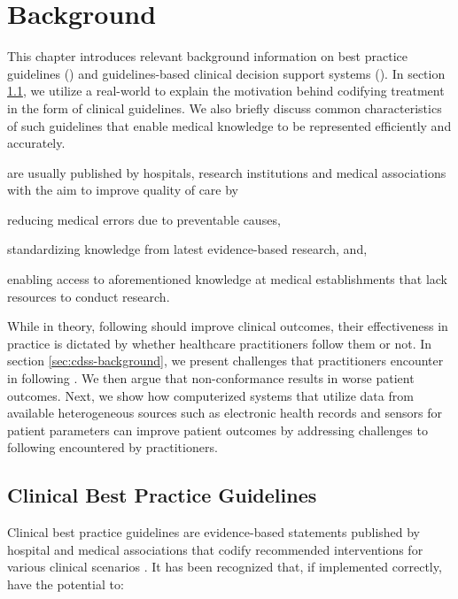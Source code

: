 \chapter{Background}

This chapter introduces relevant background information on
best practice guidelines (\BPG{}) and guidelines-based clinical decision support
systems (\CDSS{}).
In section \ref{sec:bpg-background}, we utilize a real-world \BPG{}
to explain the motivation behind codifying treatment
in the form of clinical guidelines. We also briefly discuss
common characteristics of such guidelines that enable medical knowledge
to be represented efficiently and accurately.

\BPGs{} are usually published by hospitals,
research institutions and medical associations with the aim to improve quality of care by
\begin{enumerate*}[label=(\alph*)]
  \item reducing medical errors due to preventable causes,
  \item standardizing knowledge from latest evidence-based research, and,
  \item enabling access to aforementioned knowledge at medical establishments
  that lack resources to conduct research.
\end{enumerate*}

While in theory, following \BPGs{} should improve clinical outcomes,
their effectiveness in practice is dictated by whether healthcare practitioners
follow them or not. In section \ref{sec:cdss-background}, we present
challenges that practitioners encounter in following \BPGs{}. We then argue
that non-conformance results in worse patient outcomes.
Next, we show how computerized systems that utilize data from available
heterogeneous sources such as electronic health records and sensors for
patient parameters can improve patient outcomes by addressing challenges
to following \BPGs{} encountered by practitioners.

\section{Clinical Best Practice Guidelines}\label{sec:bpg-background}

Clinical best practice guidelines are evidence-based statements
published by hospital and medical associations that codify recommended
interventions for various clinical scenarios \cite{field1990clinical}.
It has been recognized that, if implemented correctly, \BPGs{} have the potential to:

